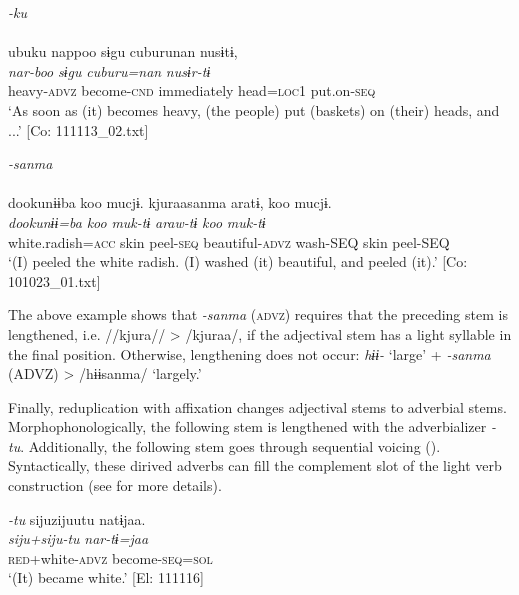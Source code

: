 \ea  \label{ex:4.61} \ea  \textit{{}-ku} \label{ex:4.61a}\\\\
    \glll     ubuku  nappoo  sɨgu  cuburunan  nusɨtɨ,\\
      \textit{}  \textit{nar-boo}  \textit{sɨgu}  \textit{cuburu=nan}  \textit{nusɨr-tɨ}\\
      heavy-\textsc{advz}  become-\textsc{cnd}  immediately  head=\textsc{loc}1  put.on-\textsc{seq}\\
      \glt       ‘As soon as (it) becomes heavy, (the people) put (baskets) on (their) heads, and ...’ [Co: 111113\_02.txt]

\ex  \textit{{}-sanma}\\\\
\glll dookunɨɨba  koo  mucjɨ.  kjuraasanma  aratɨ,   koo  mucjɨ.\\
      \textit{dookunɨɨ=ba}  \textit{koo}  \textit{muk-tɨ}  \textit{}  \textit{araw-tɨ}  \textit{koo}  \textit{muk-tɨ}\\                                                                                                  
      white.radish=\textsc{acc}  skin  peel-\textsc{seq}  beautiful-\textsc{advz}  wash-SEQ                                   skin  peel-SEQ\\
      \glt       ‘(I) peeled the white radish. (I) washed (it) beautiful, and peeled (it).’     [Co: 101023\_01.txt]
    \z
\z

The above example shows that \textit{{}-sanma} (\textsc{advz}) requires that the preceding stem is lengthened, i.e. //kjura// > /kjuraa/, if the adjectival stem has a light syllable in the final position. Otherwise, lengthening does not occur: \textit{hɨɨ-} ‘large’ + \textit{{}-sanma} (ADVZ) > /hɨɨsanma/ ‘largely.’

  Finally, reduplication with affixation changes adjectival stems to adverbial stems. Morphophonologically, the following stem is lengthened with the adverbializer \textit{{}-tu}. Additionally, the following stem goes through sequential voicing (). Syntactically, these dirived adverbs can fill the complement slot of the light verb construction (see  for more details).

\ea  \textit{{}-tu} \label{ex:4.62}
\glll   sijuzijuutu  natɨjaa.\\
    \textit{siju+siju-tu}  \textit{nar-tɨ=jaa}\\
    \textsc{red}+white-\textsc{advz}  become-\textsc{seq}=\textsc{sol}\\
    \glt     ‘(It) became white.’ [El: 111116]
\z

